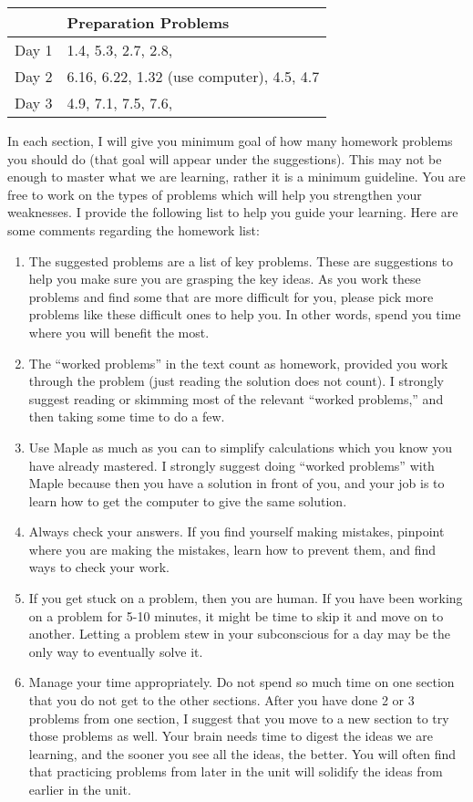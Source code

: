 \documentclass[10pt]{article}
\begin{document}
\begin{center}
\begin{tabular}{ll}
&Preparation Problems\\
\hline\hline
Day 1&1.4, 5.3, 2.7, 2.8, \\ \hline
Day 2&6.16, 6.22, 1.32 (use computer), 4.5, 4.7\\ \hline
Day 3&4.9, 7.1, 7.5, 7.6, \\ \hline
\end{tabular}
\end{center}

{\footnotesize

In each section, I will give you minimum goal of how many homework problems you should do (that goal will appear under the suggestions). This may not be enough to master what we are learning, rather it is a minimum guideline. You are free to work on the types of problems which will help you strengthen your weaknesses. I provide the following list to help you guide your learning.  Here are some comments regarding the homework list:
\begin{enumerate}
\item The suggested problems are a list of key problems.  These are suggestions to help you make sure you are grasping the key ideas. As you work these problems and find some that are more difficult for you, please pick more problems like these difficult ones to help you.  In other words, spend you time where you will benefit the most.
\item The ``worked problems'' in the text count as homework, provided you work through the problem (just reading the solution does not count). I strongly suggest reading or skimming most of the relevant ``worked problems,'' and then taking some time to do a few.  
\item Use Maple as much as you can to simplify calculations which you know you have already mastered. I strongly suggest doing ``worked problems'' with Maple because then you have a solution in front of you, and your job is to learn how to get the computer to give the same solution.
\item Always check your answers. If you find yourself making mistakes, pinpoint where you are making the mistakes, learn how to prevent them, and find ways to check your work.
\item  If you get stuck on a problem, then you are human. If you have been working on a problem for 5-10 minutes, it might be time to skip it and move on to another. Letting a problem stew in your subconscious for a day may be the only way to eventually solve it.
	\item  Manage your time appropriately. Do not spend so much time on one section that you do not get to the other sections. After you have done 2 or 3 problems from one section, I suggest that you move to a new section to try those problems as well. Your brain needs time to digest the ideas we are learning, and the sooner you see all the ideas, the better. You will often find that practicing problems from later in the unit will solidify the ideas from earlier in the unit. 
\end{enumerate}

}
\end{document}

